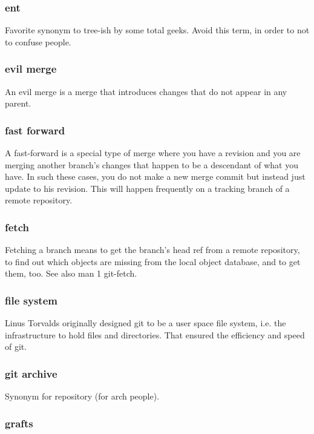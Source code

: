 \subsubsection{ent}

Favorite synonym to tree-ish by some total geeks. Avoid this term, in order to not to confuse people.

\subsubsection{evil merge}

An evil merge is a merge that introduces changes that do not appear in any parent.

\subsubsection{fast forward}

A fast-forward is a special type of merge where you have a revision and you are merging another branch's changes that happen to be a descendant of what you have. In such these cases, you do not make a new merge commit but instead just update to his revision. This will happen frequently on a tracking branch of a remote repository.

\subsubsection{fetch}

Fetching a branch means to get the branch's head ref from a remote repository, to find out which objects are missing from the local object database, and to get them, too. See also man 1 git-fetch.

\subsubsection{file system}

Linus Torvalds originally designed git to be a user space file system, i.e. the infrastructure to hold files and directories. That ensured the efficiency and speed of git.

\subsubsection{git archive}

Synonym for repository (for arch people).

\subsubsection{grafts}

